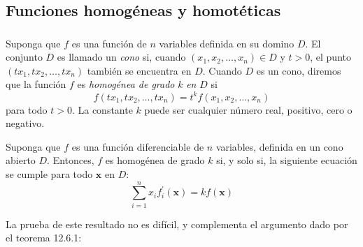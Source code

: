 \subsection{Funciones homogéneas y homotéticas}

\begin{frame}[t]
\frametitle{\subsecname}
Suponga que $f$ es una función de $n$ variables definida en su domino $D$. El conjunto $D$ es llamado un \emph{cono} si, cuando $\left(x_{1},x_{2},\ldots,x_{n}\right)\in D$ y $t>0$, el punto $\left(tx_{1},tx_{2},\ldots,tx_{n}\right)$ también se encuentra en $D$. Cuando $D$ es un cono, diremos que la función $f$ es \emph{homogénea de grado} $k$ \emph{en} $D$ si
\begin{equation}\label{eq:homogenea}
f\left(tx_{1},tx_{2},\ldots,tx_{n}\right)=t^{k}f\left(x_{1},x_{2},\ldots,x_{n}\right)
\end{equation}
para todo $t>0$. La constante $k$ puede ser cualquier número real, positivo, cero o negativo.
\begin{theorem}
	Suponga que $f$ es una función diferenciable de $n$ variables, definida en un cono abierto $D$. Entonces, $f$ es homogénea de grado $k$ si, y solo si, la siguiente ecuación se cumple para todo $\bm{x}$ en $D$:
	\begin{equation}\label{eq:euler}
	\sum_{i=1}^{n}x_{i}f^{\prime}_{i}\left(\bm{x}\right)=kf\left(\bm{x}\right)
	\end{equation}
\end{theorem}
La prueba de este resultado no es difícil, y complementa el argumento dado por el teorema 12.6.1:

\end{frame}

